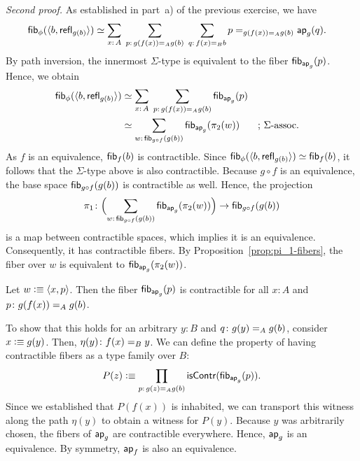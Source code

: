 \begin{solution}
    \textit{Second proof.}
    As established in part~a) of the previous exercise, we have
    \begin{align*}
        \fun{fib}_\phi(\dep{b,\fun{refl}_{g(b)}})
        &\simeq
            \sum_{x\colon A}\;
            \sum_{p\colon g(f(x))\eq{A}g(b)}\;
            \sum_{q\colon f(x)\eq{B}b}
                p
                \eq{g(f(x))\eq{A}g(b)}
                \fun{ap}_g(q).
    \end{align*}
    By path inversion, the innermost\/ $\Sigma$-type is equivalent to the fiber\/ $\mathsf{fib}_{\mathsf{ap}_g}(p)$. Hence, we obtain
    \begin{align*}
        \fun{fib}_\phi(\dep{b,\fun{refl}_{g(b)}})
            &\simeq
                \sum_{x\colon A}\;
                \sum_{p\colon g(f(x))\eq{A}g(b)}
                    \fun{fib}_{\fun{ap}_g}(p)\\
            &\simeq
                \sum_{w\colon\fun{fib}_{g\circ f}(g(b))}
                    \fun{fib}_{\fun{ap}_g}(\pi_2(w))
                &&\text{; $\Sigma$-assoc.}
    \end{align*}
    As $f$ is an equivalence, $\mathsf{fib}_f(b)$ is contractible. Since $\mathsf{fib}_\phi(\langle b,\mathsf{refl}_{g(b)}\rangle)\simeq\mathsf{fib}_f(b)$, it follows that the $\Sigma$-type above is also contractible. Because $g\circ f$ is an equivalence, the base space $\mathsf{fib}_{g\circ f}(g(b))$ is contractible as well. Hence, the projection
    \[
        \pi_1\colon
            \Bigl(
            \sum_{w\colon\fun{fib}_{g\circ f}(g(b))}
                \fun{fib}_{\fun{ap}_g}(\pi_2(w))
            \Bigr)
            \to
            \fun{fib}_{g\circ f}(g(b))
    \]
    is a map between contractible spaces, which implies it is an equivalence. Consequently, it has contractible fibers. By Proposition~\ref{prop:pi_1-fibers}, the fiber over $w$ is equivalent to $\mathsf{fib}_{\mathsf{ap}_g}(\pi_2(w))$. 

    Let $w\mathrel{\vcentcolon}\equiv\langle x,p\rangle$. Then the fiber $\mathsf{fib}_{\mathsf{ap}_g}(p)$ is contractible for all $x\colon A$ and $p\colon g(f(x))\eq{A}g(b)$. 
    
    To show that this holds for an arbitrary $y\colon B$ and $q\colon g(y)\eq{A}g(b)$, consider $x\mathrel{\vcentcolon}\equiv g(y)$. Then, $\eta(y)\colon f(x)\eq{B}y$. We can define the property of having contractible fibers as a type family over $B$:
    \[
        P(z)\defeq\prod_{p\colon g(z)\eq{A}g(b)}\fun{isContr}(\fun{fib}_{\fun{ap}_g}(p)).
    \]
    Since we established that $P(f(x))$ is inhabited, we can transport this witness along the path $\eta(y)$ to obtain a witness for $P(y)$. Because $y$ was arbitrarily chosen, the fibers of $\mathsf{ap}_g$ are contractible everywhere. Hence, $\mathsf{ap}_g$ is an equivalence. By symmetry, $\mathsf{ap}_f$ is also an equivalence.    
    
\end{solution}

